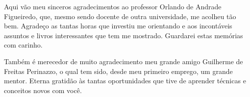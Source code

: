 Aqui vão meu sinceros agradecimentos ao professor Orlando de Andrade Figueiredo, que, 
mesmo sendo docente de outra universidade, me acolheu tão bem. 
Agradeço as tantas horas que investiu me orientando e aos incontáveis
assuntos e livros interessantes que tem me mostrado. Guardarei estas memórias com carinho.

Também é merecedor de muito agradecimento meu grande amigo Guilherme de Freitas Perinazzo, 
o qual tem sido, desde meu primeiro emprego, um grande mentor. Eterna gratidão às tantas 
oportunidades que tive de aprender técnicas e conceitos novos com você.
